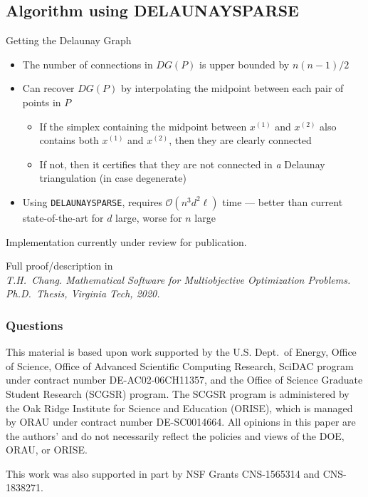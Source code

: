 \documentclass[aspectratio=169]{beamer}
\begin{document}
\subsection{Algorithm using DELAUNAYSPARSE}
\begin{frame}{Getting the Delaunay Graph}
\begin{itemize}
\item The number of connections in $DG(P)$ is upper bounded by $n(n-1)/2$
\item Can recover $DG(P)$ by interpolating the midpoint between each
pair of points in $P$
\begin{itemize}
\item If the simplex containing the midpoint between $x^{(1)}$ and $x^{(2)}$
also contains both $x^{(1)}$ and $x^{(2)}$, then they are clearly connected
\item If not, then it certifies that they are not connected in {\it a}
Delaunay triangulation (in case degenerate)
\end{itemize}
\item Using {\tt DELAUNAYSPARSE}, requires
$\mathcal{O}(n^3 d^2 \ell)$ time --- better than current state-of-the-art for
$d$ large, worse for $n$ large
\end{itemize}

\medskip
Implementation currently under review for publication.

\medskip
Full proof/description in\\
{\tiny \it T.H.~Chang. Mathematical Software for Multiobjective Optimization
Problems. Ph.D.~Thesis, Virginia Tech, 2020.}
\end{frame}

\begin{frame}
  \frametitle{Questions}
  \tableofcontents
  \bigskip
{\tiny
This material is based upon work supported by the U.S. Dept.\ of Energy,
Office of Science, Office of Advanced Scientific Computing Research, SciDAC
program under contract number DE-AC02-06CH11357, and the Office of Science
Graduate Student Research (SCGSR) program.
The SCGSR program is administered by the Oak Ridge Institute for
Science and Education (ORISE), which is managed by ORAU under contract number
DE-SC0014664.
All opinions in this paper are the authors' and do not
necessarily reflect the policies and views of the DOE, ORAU, or ORISE.

This work was also supported in part by NSF Grants CNS-1565314 and CNS-1838271.
}
\end{frame}
\end{document}
